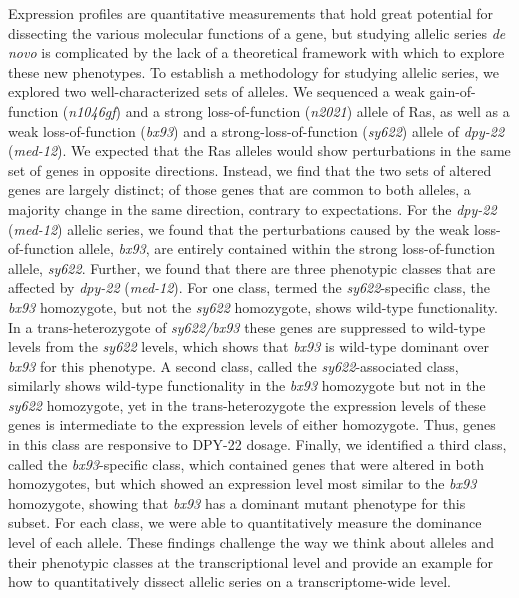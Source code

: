 \documentclass[10pt, onecolumn]{article}
\newcommand{\gene}[1]{\mbox{\emph{#1}}}
\newcommand{\protein}[1]{\mbox{\uppercase{#1}}}
\newcommand{\dpy}{\gene{dpy-22} (\emph{med-12})}
\begin{document}
Expression profiles are quantitative measurements that hold great potential for
dissecting the various molecular functions of a gene, but studying allelic
series \emph{de novo} is complicated by the lack of a theoretical framework with
which to explore these new phenotypes. To establish a methodology for studying
allelic series, we explored two well-characterized sets of alleles. We sequenced
a weak gain-of-function (\emph{n1046gf}) and a strong loss-of-function
(\emph{n2021}) allele of Ras, as well as a weak loss-of-function (\emph{bx93})
and a strong-loss-of-function (\emph{sy622}) allele of \dpy{}. We expected that
the Ras alleles would show perturbations in the same set of genes in opposite
directions. Instead, we find that the two sets of altered genes are largely
distinct; of those genes that are common to both alleles, a majority change in
the same direction, contrary to expectations. For the \dpy{} allelic series, we
found that the perturbations caused by the weak loss-of-function allele,
\emph{bx93}, are entirely contained within the strong loss-of-function allele,
\emph{sy622}. Further, we found that there are three phenotypic classes that are
affected by \dpy{}. For one class, termed the \emph{sy622}-specific class, the
\emph{bx93} homozygote, but not the \emph{sy622} homozygote, shows wild-type
functionality. In a trans-heterozygote of \emph{sy622/bx93} these genes are
suppressed to wild-type levels from the \emph{sy622} levels, which shows that
\emph{bx93} is wild-type dominant over \emph{bx93} for this phenotype. A second
class, called the \emph{sy622}-associated class, similarly shows wild-type
functionality in the \emph{bx93} homozygote but not in the \emph{sy622}
homozygote, yet in the trans-heterozygote the expression levels of these genes
is intermediate to the expression levels of either homozygote. Thus, genes in
this class are responsive to \protein{dpy-22} dosage. Finally, we identified a
third class, called the \emph{bx93}-specific class, which contained genes that
were altered in both homozygotes, but which showed an expression level most
similar to the \emph{bx93} homozygote, showing that \emph{bx93} has a dominant
mutant phenotype for this subset. For each class, we were able to quantitatively
measure the dominance level of each allele. These findings challenge the way we
think about alleles and their phenotypic classes at the transcriptional level
and provide an example for how to quantitatively dissect allelic series on a
transcriptome-wide level.
\end{document}
